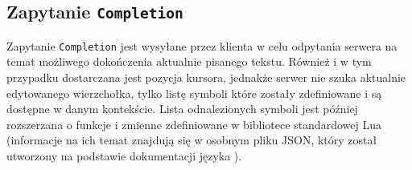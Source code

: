 \subsection{Zapytanie \texttt{Completion}}
Zapytanie \texttt{Completion} jest wysyłane przez klienta w celu odpytania serwera na temat możliwego dokończenia aktualnie pisanego tekstu. Również i w tym przypadku dostarczana jest pozycja kursora, jednakże serwer nie szuka aktualnie edytowanego wierzchołka, tylko listę symboli które zostały zdefiniowane i są dostępne w danym kontekście. Lista odnalezionych symboli jest później rozszerzana o funkcje i zmienne zdefiniowane w bibliotece standardowej Lua (informacje na ich temat znajdują się w osobnym pliku JSON, który został utworzony na podstawie dokumentacji języka \cite{lua_lib}).
